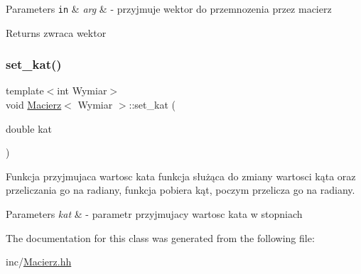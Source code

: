 \begin{DoxyParams}[1]{Parameters}
\mbox{\tt in}  & {\em arg} & -\/ przyjmuje wektor do przemnozenia przez macierz \\
\hline
\end{DoxyParams}
\begin{DoxyReturn}{Returns}
zwraca wektor 
\end{DoxyReturn}
\mbox{\label{classMacierz_ac1d682d58f77100ab13e7aa428044402}} 
\subsubsection{\texorpdfstring{set\+\_\+kat()}{set\_kat()}}
{\footnotesize\ttfamily template$<$int Wymiar$>$ \\
void \hyperlink{classMacierz}{Macierz}$<$ Wymiar $>$\+::set\+\_\+kat (\begin{DoxyParamCaption}\item[{double}]{kat }\end{DoxyParamCaption})\hspace{0.3cm}{\ttfamily [inline]}}



Funkcja przyjmujaca wartosc kata funkcja służąca do zmiany wartosci kąta oraz przeliczania go na radiany, funkcja pobiera kąt, poczym przelicza go na radiany. 


\begin{DoxyParams}{Parameters}
{\em kat} & -\/ parametr przyjmujacy wartosc kata w stopniach \\
\hline
\end{DoxyParams}


The documentation for this class was generated from the following file\+:\begin{DoxyCompactItemize}
\item 
inc/\hyperlink{Macierz_8hh}{Macierz.\+hh}\end{DoxyCompactItemize}
